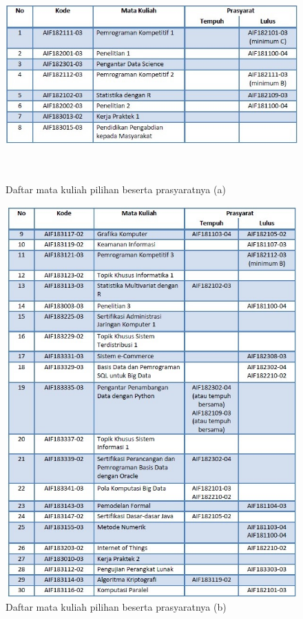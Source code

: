 \begin{figure}[H]
    \centering
    \includegraphics[width=12cm, height=8cm]{Gambar/Prasyarat MK Pilihan 1.jpg}
    \caption{Daftar mata kuliah pilihan beserta prasyaratnya (a)}
    \label{fig:gambar11}
\end{figure}

\begin{figure}[H]
    \centering
    \includegraphics[width=12cm, height=15cm]{Gambar/Prasyarat MK Pilihan 2.jpg}
    \caption{Daftar mata kuliah pilihan beserta prasyaratnya (b)}
    \label{fig:gambar12}
\end{figure}

